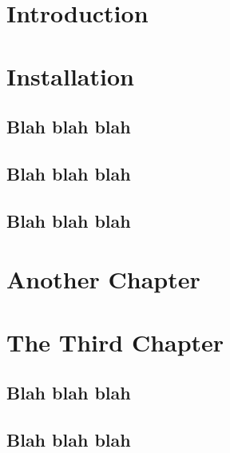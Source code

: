 


    \makecoverpage
    \setcounter{tocdepth}{1}
    \sffamily{\tableofcontents}
    \clearpage
    \pagestyle{plain}
    \rmfamily\mdseries\normalsize

    \chapter{Introduction}

    \lipsum[1]

    \lipsum[1]



    \chapter{Installation}
    \lipsum[1]
    
    \section{Blah blah blah}
    \lipsum[1]
    
    \section{Blah blah blah}
    \lipsum[1]
    
    \section{Blah blah blah}
    \lipsum[1]



    \chapter{Another Chapter}
    \lipsum[1]
    
    \lipsum[1]



    \chapter{The Third Chapter}
    \lipsum[1]
    
    \section{Blah blah blah}
    \lipsum[1]
    
    \section{Blah blah blah}
    \lipsum[1]



